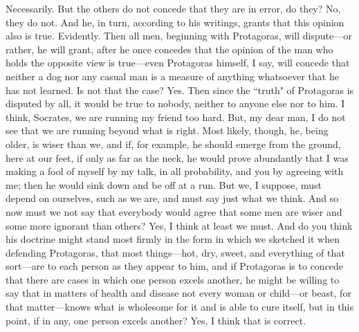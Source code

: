\documentclass[letterpaper,12pt]{article}
\newcommand{\stephpag}[1]{\marginnote{\small\itshape\fontfamily{ppl}\selectfont #1}}
\begin{document}
\begin{drama}
\theodorusspeaks
Necessarily.
\socratesspeaks
But the others do not concede that they are in error, do they?
\theodorusspeaks
No, they do not.
\socratesspeaks
And he, in turn, according to his writings, grants that this opinion also is true.
\theodorusspeaks
Evidently.
\socratesspeaks
Then all men, beginning with Protagoras, will dispute—or rather, he will grant, after he once concedes that the opinion of the man who holds the opposite view is true—even Protagoras himself, I say, \stephpag{c} will concede that neither a dog nor any casual man is a measure of anything whatsoever that he has not learned. Is not that the case?
\theodorusspeaks
Yes.
\socratesspeaks
Then since the ``truth" of Protagoras is disputed by all, it would be true to nobody, neither to anyone else nor to him.
\theodorusspeaks
I think, Socrates, we are running my friend too hard.
\socratesspeaks
But, my dear man, I do not see that we are running beyond what is right. Most likely, though, he, being older, \stephpag{d} is wiser than we, and if, for example, he should emerge from the ground, here at our feet, if only as far as the neck, he would prove abundantly that I was making a fool of myself by my talk, in all probability, and you by agreeing with me; then he would sink down and be off at a run. But we, I suppose, must depend on ourselves, such as we are, and must say just what we think. And so now must we not say that everybody would agree that some men are wiser and some more ignorant than others?
\theodorusspeaks
Yes, I think at least we must.
\socratesspeaks
And do you think his doctrine might stand most firmly in the form in which we sketched it when defending Protagoras, \stephpag{e} that most things—hot, dry, sweet, and everything of that sort—are to each person as they appear to him, and if Protagoras is to concede that there are cases in which one person excels another, he might be willing to say that in matters of health and disease not every woman or child—or beast, for that matter—knows what is wholesome for it and is able to cure itself, but in this point, if in any, one person excels another?
\theodorusspeaks
Yes, I think that is correct. \stephpag{172 a}
\socratesspeaks

\end{drama}
\end{document}
